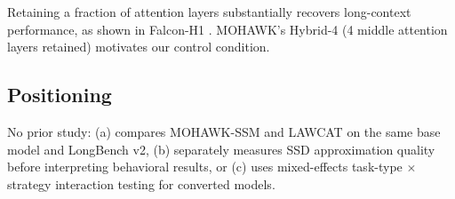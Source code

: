 Retaining a fraction of attention layers substantially recovers long-context performance, as
shown in Falcon-H1 \citep{Zuo2025FalconH1}. MOHAWK's Hybrid-4 (4 middle attention layers
retained) motivates our control condition.

\subsection{Positioning}

No prior study: (a) compares MOHAWK-SSM and LAWCAT on the same base model and LongBench v2,
(b) separately measures SSD approximation quality before interpreting behavioral results, or
(c) uses mixed-effects task-type $\times$ strategy interaction testing for converted models.
